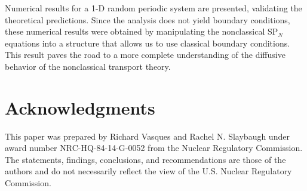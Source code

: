 \documentclass{anstrans}
\begin{document}
Numerical results for a 1-D random periodic system are presented, validating the theoretical predictions.
Since the analysis does not yield boundary conditions, these numerical results were obtained by manipulating the nonclassical SP$_N$ equations into a structure that allows us to use classical boundary conditions.
This result paves the road to a more complete understanding of the diffusive behavior of the nonclassical transport theory.

\section{Acknowledgments}
This paper was prepared by Richard Vasques and Rachel N. Slaybaugh under award number NRC-HQ-84-14-G-0052 from the Nuclear Regulatory Commission.
The statements, findings, conclusions, and recommendations are those of the authors and do not necessarily reflect the view of the U.S. Nuclear Regulatory Commission.



\end{document}
